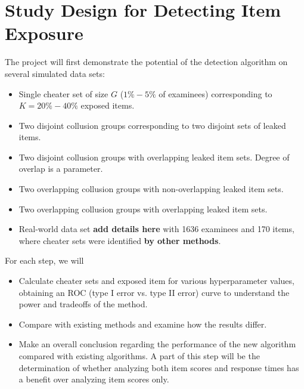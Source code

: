 \documentclass{article}
\begin{document}
\section{Study Design for Detecting Item Exposure}
The project will first demonstrate the potential of the detection algorithm on several simulated data sets: 
\begin{itemize}
	\item Single cheater set of size $G$ ($1\%-5\%$ of examinees) corresponding to $K=20\%-40\%$ exposed items.
	\item Two disjoint collusion groups corresponding to two disjoint sets of leaked items.
	\item Two disjoint collusion groups with overlapping leaked item sets. Degree of overlap is a parameter.
	\item Two overlapping collusion groups with non-overlapping leaked item sets.
	\item Two overlapping collusion groups with overlapping leaked item sets.
	\item Real-world data set {\bf add details here} with 1636 examinees and 170 items, where cheater sets were identified {\bf by other methods}.
\end{itemize}
For each step, we will
\begin{itemize}
	\item Calculate cheater sets and exposed item for various hyperparameter values, obtaining an ROC (type I error vs. type II error) curve to understand the power and tradeoffs of the method.
	\item Compare with existing methods and examine how the results differ.
	\item Make an overall conclusion regarding the performance of the new algorithm compared with existing algorithms. A part of this step will be the determination of whether analyzing both item scores and response times has a benefit over analyzing item scores only.
\end{itemize}



\end{document}
